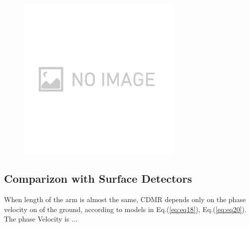 \documentclass[a4paper,12pt]{book}
\begin{document}
\begin{figure}[H]
  \begin{center}
    \includegraphics[width=8cm]{./img_no_image.png}
  \end{center}
  \caption{}
  \label{img:img_seismometer_map}
\end{figure}






\subsection{Comparizon with Surface Detectors}
When length of the arm is almost the same, CDMR depends only on the phase velocity on of the ground, according to models in Eq.(\ref{eq:eq18}), Eq.(\ref{eq:eq20}). The phase Velocity is ...
\end{document}
